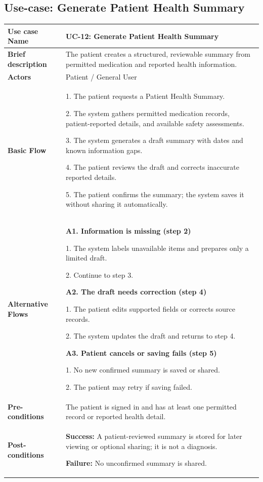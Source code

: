 \clearpage
\subsection{Use-case: Generate Patient Health Summary}
\label{uc:uc-12}
\begin{longtable}{|p{}|p{}|}
\hline
\textbf{Use case Name} & UC-12: Generate Patient Health Summary \\ \hline
\textbf{Brief description} & The patient creates a structured, reviewable summary from permitted medication and reported health information. \\ \hline
\textbf{Actors} & Patient / General User \\ \hline
\textbf{Basic Flow} &
1. The patient requests a Patient Health Summary.\par
2. The system gathers permitted medication records, patient-reported details, and available safety assessments.\par
3. The system generates a draft summary with dates and known information gaps.\par
4. The patient reviews the draft and corrects inaccurate reported details.\par
5. The patient confirms the summary; the system saves it without sharing it automatically.
\\ \hline
\textbf{Alternative Flows} &
\textbf{A1. Information is missing (step 2)}\par
1. The system labels unavailable items and prepares only a limited draft.\par
2. Continue to step 3.
\par\smallskip
\textbf{A2. The draft needs correction (step 4)}\par
1. The patient edits supported fields or corrects source records.\par
2. The system updates the draft and returns to step 4.
\par\smallskip
\textbf{A3. Patient cancels or saving fails (step 5)}\par
1. No new confirmed summary is saved or shared.\par
2. The patient may retry if saving failed.
\\ \hline
\textbf{Pre-conditions} & The patient is signed in and has at least one permitted record or reported health detail. \\ \hline
\textbf{Post-conditions} & \textbf{Success:} A patient-reviewed summary is stored for later viewing or optional sharing; it is not a diagnosis.\par
\textbf{Failure:} No unconfirmed summary is shared. \\ \hline
\end{longtable}


